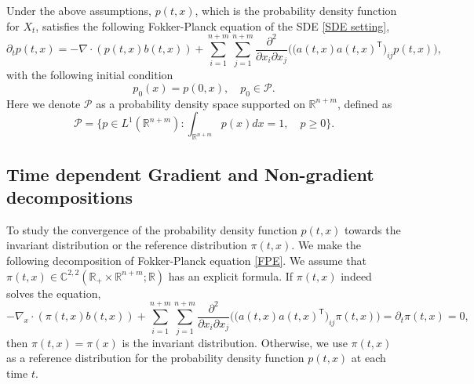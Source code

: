 \documentclass[11pt,reqno]{amsart}
\newcommand{\ts}{\mathsf{T}}
\begin{document}
Under the above assumptions, $p(t,x)$, which is the probability density function for $X_t$, satisfies the following Fokker-Planck equation of the SDE \eqref{SDE setting},
\begin{equation}\label{FPE}
\partial_tp(t,x)=-\nabla\cdot(p(t, x)b(t, x))+\sum_{i=1}^{n+m}\sum_{j=1}^{n+m}\frac{\partial^2}{\partial x_i\partial x_j} \Big(\Big(a(t,x)a(t,x)^{\ts}\Big)_{ij}p(t,x)\Big),
\end{equation}
with the following initial condition 
\begin{equation*}
p_0(x)=p(0,x), \quad p_0\in\mathcal P.
\end{equation*}
Here we denote $\mathcal P$ as a probability density space supported on $\mathbb R^{n+m}$, defined as
\begin{equation*}
    \mathcal{P}=\Big\{p\in L^1(\mathbb R^{n+m})\colon \int_{\mathbb{R}^{n+m}} p(x)dx=1,\quad p\geq 0\Big\}. 
\end{equation*}


\subsection{Time dependent Gradient and Non-gradient decompositions}
To study the convergence of the probability density function $p(t,x)$ towards the invariant distribution or the reference distribution $\pi(t,x)$. We make the following decomposition of Fokker-Planck equation \eqref{FPE}. We assume that $\pi(t,x)\in \mathbb C^{2,2}(\mathbb R_+\times\mathbb R^{n+m};\mathbb R)$ has an explicit formula. If $\pi(t,x)$ indeed solves the equation, 
\begin{equation*}
    -\nabla_x\cdot(\pi(t, x)b(t, x))+\sum_{i=1}^{n+m}\sum_{j=1}^{n+m}\frac{\partial^2}{\partial x_i\partial x_j}\Big(\Big(a(t,x)a(t,x)^{\ts}\Big)_{ij} \pi(t,x)\Big)=\partial_t\pi(t,x)=0,
\end{equation*}
then $\pi(t,x)=\pi(x)$ is the invariant distribution. Otherwise, we use $\pi(t,x)$ as a reference distribution for the probability density function $p(t,x)$ at each time $t$.
\end{document}
